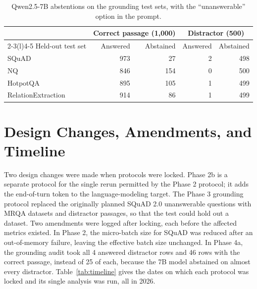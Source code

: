 \documentclass[10pt]{article}
\begin{document}
\begin{table}[h]
\centering
\small
\begin{tabular}{@{}lrrrr@{}}
\toprule
 & \multicolumn{2}{c}{Correct passage (1,000)} & \multicolumn{2}{c}{Distractor (500)} \\
\cmidrule(lr){2-3}\cmidrule(l){4-5}
Held-out test set & Answered & Abstained & Answered & Abstained \\
\midrule
SQuAD & 973 & 27 & 2 & 498 \\
NQ & 846 & 154 & 0 & 500 \\
HotpotQA & 895 & 105 & 1 & 499 \\
RelationExtraction & 914 & 86 & 1 & 499 \\
\bottomrule
\end{tabular}
\caption{Qwen2.5-7B abstentions on the grounding test sets, with the ``unanswerable'' option in the prompt.}
\label{tab:abstain}
\end{table}

\section{Design Changes, Amendments, and Timeline}
\label{app:amendments}

Two design changes were made when protocols were locked. Phase 2b is a separate protocol for the single rerun permitted by the Phase 2 protocol; it adds the end-of-turn token to the language-modeling target. The Phase 3 grounding protocol replaced the originally planned SQuAD 2.0 unanswerable questions with MRQA datasets and distractor passages, so that the test could hold out a dataset. Two amendments were logged after locking, each before the affected metrics existed. In Phase 2, the micro-batch size for SQuAD was reduced after an out-of-memory failure, leaving the effective batch size unchanged. In Phase 4a, the grounding audit took all 4 answered distractor rows and 46 rows with the correct passage, instead of 25 of each, because the 7B model abstained on almost every distractor. Table~\ref{tab:timeline} gives the dates on which each protocol was locked and its single analysis was run, all in 2026.
\end{document}
